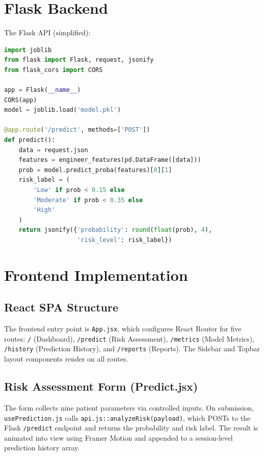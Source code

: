 \documentclass[12pt,a4paper]{report}
\begin{document}
\section{Flask Backend}

The Flask API (simplified):

\begin{lstlisting}[language=Python, caption=Flask Predict Endpoint]
import joblib
from flask import Flask, request, jsonify
from flask_cors import CORS

app = Flask(__name__)
CORS(app)
model = joblib.load('model.pkl')

@app.route('/predict', methods=['POST'])
def predict():
    data = request.json
    features = engineer_features(pd.DataFrame([data]))
    prob = model.predict_proba(features)[0][1]
    risk_label = (
        'Low' if prob < 0.15 else
        'Moderate' if prob < 0.35 else
        'High'
    )
    return jsonify({'probability': round(float(prob), 4),
                    'risk_level': risk_label})
\end{lstlisting}

\section{Frontend Implementation}

\subsection{React SPA Structure}

The frontend entry point is \texttt{App.jsx}, which configures React Router for five routes: \texttt{/} (Dashboard), \texttt{/predict} (Risk Assessment), \texttt{/metrics} (Model Metrics), \texttt{/history} (Prediction History), and \texttt{/reports} (Reports). The Sidebar and Topbar layout components render on all routes.

\subsection{Risk Assessment Form (Predict.jsx)}

The form collects nine patient parameters via controlled inputs. On submission, \texttt{usePrediction.js} calls \texttt{api.js::analyzeRisk(payload)}, which POSTs to the Flask \texttt{/predict} endpoint and returns the probability and risk label. The result is animated into view using Framer Motion and appended to a session-level prediction history array.
\end{document}
